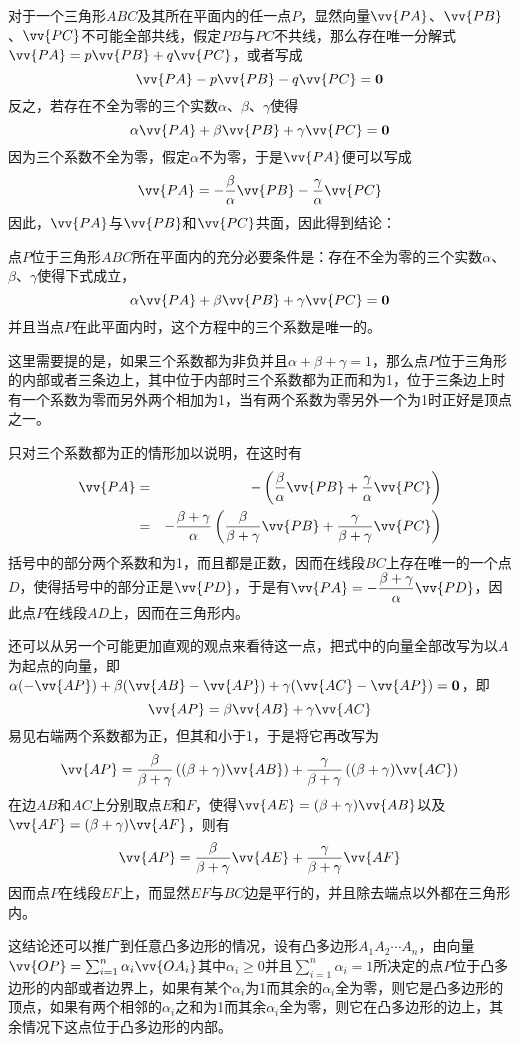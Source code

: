 \begin{example}
  \label{example:point-P-and-triangle-ABC}
  对于一个三角形$ABC$及其所在平面内的任一点$P$，显然向量$\vv{PA}$、$\vv{PB}$、$\vv{PC}$不可能全部共线，假定$PB$与$PC$不共线，那么存在唯一分解式$\vv{PA}=p\vv{PB}+q\vv{PC}$，或者写成
  \[ \vv{PA}-p\vv{PB}-q\vv{PC}=\bm{0} \]
  反之，若存在不全为零的三个实数$\alpha$、$\beta$、$\gamma$使得
  \[ \alpha \vv{PA} + \beta \vv{PB} + \gamma \vv{PC} = \bm{0} \]
  因为三个系数不全为零，假定$\alpha$不为零，于是$\vv{PA}$便可以写成
  \[ \vv{PA} = -\frac{\beta}{\alpha} \vv{PB} - \frac{\gamma}{\alpha} \vv{PC} \]
  因此，$\vv{PA}$与$\vv{PB}$和$\vv{PC}$共面，因此得到结论：
  \begin{theorem}
    点$P$位于三角形$ABC$所在平面内的充分必要条件是：存在不全为零的三个实数$\alpha$、$\beta$、$\gamma$使得下式成立，
    \[ \alpha \vv{PA} + \beta \vv{PB} + \gamma \vv{PC} = \bm{0} \]
    并且当点$P$在此平面内时，这个方程中的三个系数是唯一的。
  \end{theorem}
这里需要提的是，如果三个系数都为非负并且$\alpha+\beta+\gamma = 1$，那么点$P$位于三角形的内部或者三条边上，其中位于内部时三个系数都为正而和为1，位于三条边上时有一个系数为零而另外两个相加为1，当有两个系数为零另外一个为1时正好是顶点之一。

  只对三个系数都为正的情形加以说明，在这时有
  \begin{eqnarray*}
    \vv{PA} & = & - \left( \frac{\beta}{\alpha}\vv{PB} + \frac{\gamma}{\alpha} \vv{PC} \right) \\
    & = & -\frac{\beta+\gamma}{\alpha} \left( \frac{\beta}{\beta+\gamma} \vv{PB} + \frac{\gamma}{\beta+\gamma} \vv{PC} \right)
  \end{eqnarray*}
  括号中的部分两个系数和为1，而且都是正数，因而在线段$BC$上存在唯一的一个点$D$，使得括号中的部分正是$\vv{PD}$，于是有$\vv{PA}=-\dfrac{\beta+\gamma}{\alpha} \vv{PD}$，因此点$P$在线段$AD$上，因而在三角形内。

  还可以从另一个可能更加直观的观点来看待这一点，把式中的向量全部改写为以$A$为起点的向量，即$\alpha (-\vv{AP})+\beta (\vv{AB}-\vv{AP})+\gamma (\vv{AC}-\vv{AP})=\bm{0}$，即
  \[ \vv{AP} = \beta \vv{AB} + \gamma \vv{AC} \]
  易见右端两个系数都为正，但其和小于1，于是将它再改写为
  \[ \vv{AP} = \frac{\beta}{\beta+\gamma} \left( (\beta+\gamma)\vv{AB} \right) + \frac{\gamma}{\beta+\gamma} \left( (\beta+\gamma) \vv{AC} \right) \]
  在边$AB$和$AC$上分别取点$E$和$F$，使得$\vv{AE} = (\beta+\gamma)\vv{AB}$以及$\vv{AF}=(\beta+\gamma)\vv{AF}$，则有
  \[ \vv{AP}=\frac{\beta}{\beta+\gamma} \vv{AE} + \frac{\gamma}{\beta+\gamma} \vv{AF} \]
  因而点$P$在线段$EF$上，而显然$EF$与$BC$边是平行的，并且除去端点以外都在三角形内。

  这结论还可以推广到任意凸多边形的情况，设有凸多边形$A_1A_2\cdots A_n$，由向量$\vv{OP}=\sum_{i=1}^n\alpha_i\vv{OA_i}$其中$\alpha_i\geqslant 0$并且$\sum_{i=1}^n\alpha_i=1$所决定的点$P$位于凸多边形的内部或者边界上，如果有某个$\alpha_i$为1而其余的$\alpha_i$全为零，则它是凸多边形的顶点，如果有两个相邻的$\alpha_i$之和为1而其余$\alpha_i$全为零，则它在凸多边形的边上，其余情况下这点位于凸多边形的内部。
\end{example}

